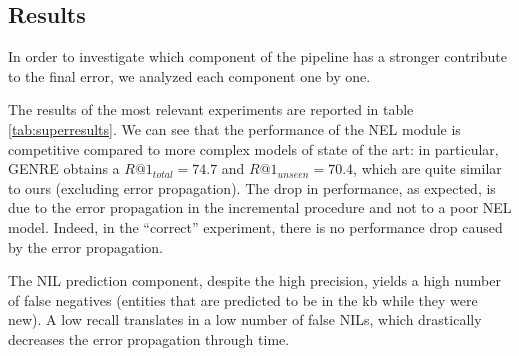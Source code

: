 \subsection{Results}
In order to investigate which component of the pipeline has a stronger contribute to the final error, we analyzed each component one by one.

The results of the most relevant experiments are reported in table \ref{tab:superresults}.
We can see that the performance of the NEL module is competitive compared to more complex models of state of the art: in particular, GENRE \cite{decao2021autoregressive} obtains a $R@1_{total} = 74.7$ and $R@1_{unseen} = 70.4$, which are quite similar to ours (excluding error propagation).
The drop in performance, as expected, is due to the error propagation in the incremental procedure and not to a poor NEL model. Indeed, in the ``correct'' experiment, there is no performance drop caused by the error propagation.

The NIL prediction component, despite the high precision, yields a high number of false negatives (entities that are predicted to be in the \ac{kb} while they were new).
A low recall translates in a low number of false NILs, which drastically decreases the error propagation through time.



